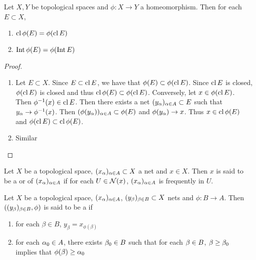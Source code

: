 \documentclass{book}
\begin{document}
	\begin{ex} 
		Let $X, Y$ be topological spaces and $\phi: X \rightarrow Y$ a homeomorphism. Then for each $E \subset X$, 
		\begin{enumerate}
			\item $\operatorname{cl} \phi(E) = \phi(\operatorname{cl} E)$  
			\item $\operatorname{Int} \phi(E) = \phi( \operatorname{Int} E)$  
		\end{enumerate} 
	\end{ex}
	
	\begin{proof}\
		\begin{enumerate}
			\item Let $E \subset X$. Since $E \subset \operatorname{cl} E$, we have that $\phi(E) \subset \phi(\operatorname{cl} E)$. Since $\operatorname{cl} E$ is closed, $\phi(\operatorname{cl} E)$ is closed and thus $\operatorname{cl} \phi(E) \subset \phi(\operatorname{cl} E)$. Conversely, let $x \in \phi(\operatorname{cl} E)$. Then $\phi^{-1}(x) \in \operatorname{cl} E$. Then there exists a net $( y_{\alpha} )_{\alpha \in A} \subset E$ such that $y_{\alpha} \rightarrow \phi^{-1}(x)$. Then $( \phi(y_{\alpha}) )_{\alpha \in A } \subset \phi(E)$ and $\phi(y_{\alpha}) \rightarrow x$. Thus $x \in \operatorname{cl} \phi(E)$ and $\phi(\operatorname{cl} E) \subset \operatorname{cl} \phi(E)$.
			\item Similar
		\end{enumerate} 
	\end{proof}

	\begin{defn} 
		Let $X$ be a topological space, $(x_{\alpha})_{\alpha \in A} \subset X$ a net and $x \in X$. Then $x$ is said to be a  or  of $(x_{\al})_{\al \in A}$ if for each $U \in \mathcal{N}(x)$, $(x_{\al})_{\al \in A}$ is frequently in $U$.
	\end{defn}
	
	\begin{defn} 
	Let $X$ be a topological space, $(x_{\al})_{\al \in A}$, $(y_{\beta})_{\beta \in B} \subset X$ nets and $\phi:B \rightarrow A$. 
	Then $((y_{\beta})_{\beta \in B}, \phi)$ is said to be a \tbf{subnet of $(x_{\al})_{\al \in A}$} if 
	\begin{enumerate}
		\item for each $\beta \in B$, $y_{\beta} = x_{\phi(\beta)}$
		\item for each $\alpha_0 \in A$, there exists $\beta_0 \in B$ such that for each $\beta \in B$, $\beta \geq \beta_0$ implies that $\phi(\beta) \geq \alpha_0$
	\end{enumerate}
	\end{defn}
	
\end{document}
